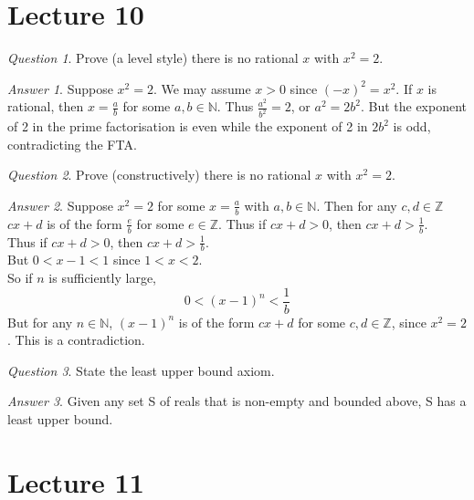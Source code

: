 \documentclass[]{article}
\def\naturals{\mathbb{N}}
\def\integers{\mathbb{Z}}
\theoremstyle{remark}
\theoremstyle{qnstyle}
\newtheorem{question}{Question}
\theoremstyle{answerstyle}
\newtheorem*{answer}{Answer}
\begin{document}
\section* {Lecture 10}

\begin{question}
    Prove (a level style) there is no rational $x$ with $x^2 = 2$.
\end{question}
\begin{answer}
    Suppose $x^2 = 2$. We may assume $x>0$ since $(-x)^2 = x^2$. If $x$ is rational,
    then $x = \frac{a}{b}$ for some $a,b \in \naturals$. 
    Thus $\frac{a^2}{b^2} =2$, or $a^2 = 2b^2$. But the exponent of 2 in the 
    prime factorisation is even while the exponent of 2 in $2b^2$ is odd,
    contradicting the FTA.
\end{answer}

\begin{question}
    Prove (constructively) there is no rational $x$ with $x^2 = 2$.
\end{question}
\begin{answer}
    Suppose $x^2 = 2$ for some $x = \frac{a}{b}$ with $a,b \in \naturals$. Then
    for any $c,d \in \integers$ $cx+d$ is of the form $\frac{e}{b}$ for some
    $e \in \integers$. Thus if $cx + d > 0$, then $cx + d > \frac{1}{b}$.\\
    Thus if $cx+d>0$, then $cx+d > \frac{1}{b}$.\\
    But $0 < x-1 < 1$ since $1 < x <2$.\\
    So if $n$ is sufficiently large,
        $$0 < (x-1)^n < \frac{1}{b}$$
    But for any $n \in \naturals$, $(x-1)^n$ is of the form $cx+d$ for some
    $c,d \in \integers$, since $x^2 = 2$. This is a contradiction.
\end{answer}

\begin{question}
    State the least upper bound axiom.
\end{question}
\begin{answer}
    Given any set S of reals that is non-empty and bounded above, S has
    a least upper bound.
\end{answer}





\section* {Lecture 11}
\end{document}

